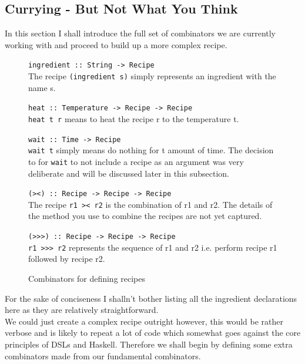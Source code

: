 \documentclass[11pt]{article}
\begin{document}
    \subsection{Currying - But Not What You Think}
    In this section I shall introduce the full set of combinators we are
    currently working with and proceed to build up a more complex recipe.

    \begin{figure}[ht]
        \centering
            \begin{multicols}{2}
                \raggedright
                \footnotesize
                \texttt{ingredient :: String -> Recipe} \\
                The recipe \texttt{(ingredient s)} simply represents an ingredient
                with the name s.

                \texttt{heat :: Temperature -> Recipe -> Recipe} \\
                \texttt{heat t r} means to heat the recipe r to the temperature t.

                \texttt{wait :: Time -> Recipe} \\
                \texttt{wait t} simply means do nothing for t amount of time.
                The decision to for \texttt{wait} to not include a recipe as
                an argument was very deliberate and will be discussed later
                in this subsection.

                \texttt{(><) :: Recipe -> Recipe -> Recipe} \\
                The recipe \texttt{r1 >< r2} is the combination of r1 and r2.
                The details of the method you use to combine the recipes are
                not yet captured.

                \texttt{(>>>) :: Recipe -> Recipe -> Recipe} \\
                \texttt{r1 >>> r2} represents the sequence of r1 and r2 i.e.
                perform recipe r1 followed by recipe r2.
            \end{multicols}
        \caption{Combinators for defining recipes}
    \end{figure}

    For the sake of conciseness I shalln't bother listing all the ingredient
    declarations here as they are relatively straightforward. \\

    We could just create a complex recipe outright however, this would be rather
    verbose and is likely to repeat a lot of code which somewhat goes against
    the core principles of DSLs and Haskell. Therefore we shall begin by defining
    some extra combinators made from our fundamental combinators. \\
\end{document}
